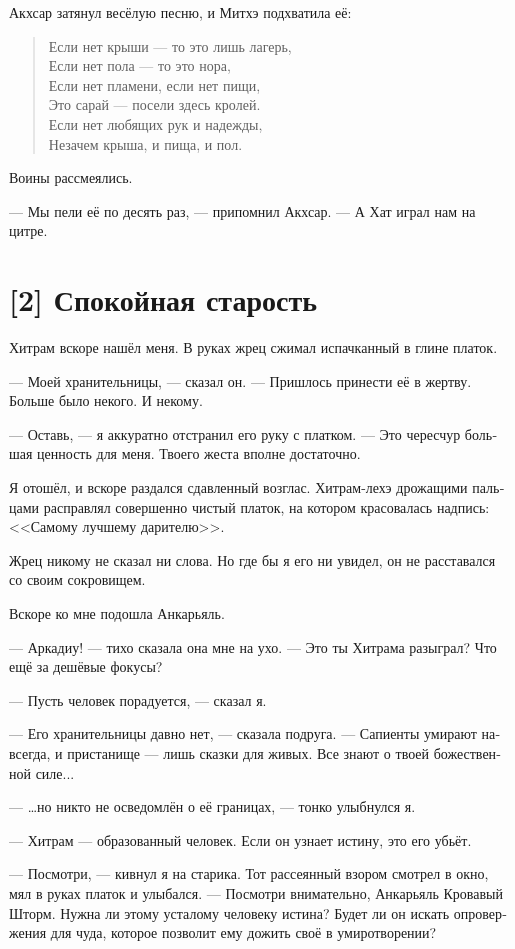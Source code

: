 \documentclass[a4paper,12pt,fleqn]{book}\usepackage{polyglossia}\setdefaultlanguage[babelshorthands=true]{russian}\setotherlanguage{english}\defaultfontfeatures{Ligatures=TeX,Mapping=tex-text}\usepackage{xcolor}\newcommand{\ml}[3]{#2}
\begin{document}
{Акхсар затянул весёлую песню, и Митхэ подхватила её:

\begin{verse}
Если нет крыши --- то это лишь лагерь,\\
Если нет пола --- то это нора,\\
Если нет пламени, если нет пищи,\\
Это сарай --- посели здесь кролей.\\
Если нет любящих рук и надежды,\\
Незачем крыша, и пища, и пол.
\end{verse}

Воины рассмеялись.

--- Мы пели её по десять раз, --- припомнил Акхсар.
--- А Хат играл нам на цитре.

\section{[2] Спокойная старость}

Хитрам вскоре нашёл меня.
В руках жрец сжимал испачканный в глине платок.

--- Моей хранительницы, --- сказал он.
--- Пришлось принести её в жертву.
Больше было некого.
И некому.

--- Оставь, --- я аккуратно отстранил его руку с платком.
--- Это чересчур большая ценность для меня.
Твоего жеста вполне достаточно.

Я отошёл, и вскоре раздался сдавленный возглас.
Хитрам-лехэ дрожащими пальцами расправлял совершенно чистый платок, на котором красовалась надпись: <<Самому лучшему дарителю>>.

Жрец никому не сказал ни слова.
Но где бы я его ни увидел, он не расставался со своим сокровищем.

Вскоре ко мне подошла Анкарьяль.

--- Аркадиу! --- тихо сказала она мне на ухо.
--- Это ты Хитрама разыграл?
Что ещё за дешёвые фокусы?

--- Пусть человек порадуется, --- сказал я.

--- Его хранительницы давно нет, --- сказала подруга.
--- Сапиенты умирают навсегда, и пристанище --- лишь сказки для живых.
Все знают о твоей божественной силе...

--- \ldots но никто не осведомлён о её границах, --- тонко улыбнулся я.

--- Хитрам --- образованный человек.
Если он узнает истину, это его убьёт.

--- Посмотри, --- кивнул я на старика.
Тот рассеянный взором смотрел в окно, мял в руках платок и улыбался.
--- Посмотри внимательно, Анкарьяль Кровавый Шторм.
Нужна ли этому усталому человеку истина?
Будет ли он искать опровержения для чуда, которое позволит ему дожить своё в умиротворении?

}
\end{document}
